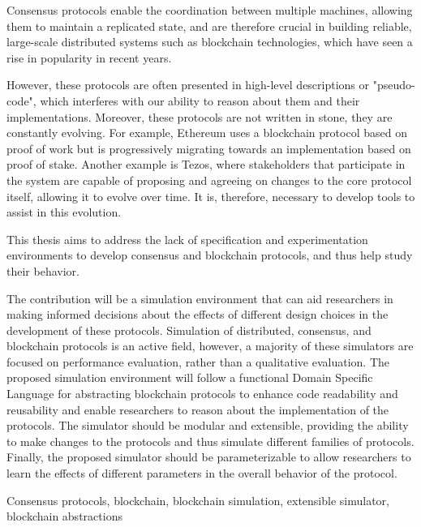 


Consensus protocols enable the coordination between multiple machines, allowing them to maintain a replicated state, and are therefore crucial in building reliable, large-scale distributed systems such as blockchain technologies, which have seen a rise in popularity in recent years.

However, these protocols are often presented in high-level descriptions or "pseudo-code", which interferes with our ability to reason about them and their implementations. Moreover, these protocols are not written in stone, they are constantly evolving. For example, Ethereum uses a blockchain protocol based on proof of work but is progressively migrating towards an implementation based on proof of stake. Another example is Tezos, where stakeholders that participate in the system are capable of proposing and agreeing on changes to the core protocol itself, allowing it to evolve over time. It is, therefore, necessary to develop tools to assist in this evolution.

This thesis aims to address the lack of specification and experimentation environments to develop consensus and blockchain protocols, and thus help study their behavior.

The contribution will be a simulation environment that can aid researchers in making informed decisions about the effects of different design choices in the development of these protocols. Simulation of distributed, consensus, and blockchain protocols is an active field, however, a majority of these simulators are focused on performance evaluation, rather than a qualitative evaluation. The proposed simulation environment will follow a functional Domain Specific Language for abstracting blockchain protocols to enhance code readability and reusability and enable researchers to reason about the implementation of the protocols. The simulator should be modular and extensible, providing the ability to make changes to the protocols and thus simulate different families of protocols. Finally, the proposed simulator should be parameterizable to allow researchers to learn the effects of different parameters in the overall behavior of the protocol.





\begin{keywords}
Consensus protocols, blockchain, blockchain simulation, extensible simulator, blockchain abstractions
\end{keywords} 
